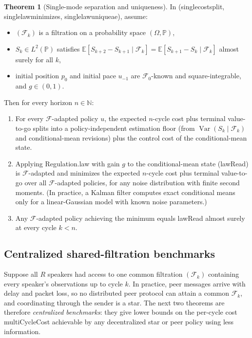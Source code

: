 \documentclass[11pt,a4paper]{article}
\DeclareRobustCommand{\lean}[1]{{\ttfamily\def\_{\textunderscore\allowbreak}#1}}
\newcommand{\E}{\mathbb{E}}
\newcommand{\Prob}{\mathbb{P}}
\theoremstyle{definition}
\newtheorem{theorem}[definition]{Theorem}
\begin{document}
\begin{theorem}[Single-mode separation and uniqueness]
\label{thm:single-sep}
In  (\lean{single\_cost\_split},
\lean{single\_law\_minimizes}, \lean{single\_law\_unique\_ae}), assume:
\begin{itemize}
\item $(\mathcal{F}_k)$ is a filtration on a probability space $(\Omega, \Prob)$,
\item $S_k \in L^2(\Prob)$ satisfies
  $\E[S_{k+2} - S_{k+1} \mid \mathcal{F}_k] =
   \E[S_{k+1} - S_k \mid \mathcal{F}_k]$ almost surely for all $k$,
\item initial position $p_0$ and initial pace $u_{-1}$ are
  $\mathcal{F}_0$-known and square-integrable, and $g \in (0, 1)$.
\end{itemize}
Then for every horizon $n \in \mathbb{N}$:
\begin{enumerate}
\item For every $\mathcal{F}$-adapted policy $u$, the expected $n$-cycle cost
  plus terminal value-to-go splits into a policy-independent estimation floor
  (from $\operatorname{Var}(S_k \mid \mathcal{F}_k)$ and conditional-mean
  revisions) plus the control cost of the conditional-mean state.
\item Applying \lean{Regulation.law} with gain $g$ to the conditional-mean
  state (\lean{lawRead}) is $\mathcal{F}$-adapted and minimizes the expected
  $n$-cycle cost plus terminal value-to-go over all $\mathcal{F}$-adapted
  policies, for any noise distribution with finite second moments. (In
  practice, a Kalman filter computes exact conditional means only for a
  linear-Gaussian model with known noise parameters.)
\item Any $\mathcal{F}$-adapted policy achieving the minimum equals
  \lean{lawRead} almost surely at every cycle $k < n$.
\end{enumerate}
\end{theorem}

\subsection{Centralized shared-filtration benchmarks}

Suppose all $R$ speakers had access to one common filtration $(\mathcal{F}_k)$
containing every speaker's observations up to cycle $k$. In practice, peer
messages arrive with delay and packet loss, so no distributed peer protocol can
attain a common $\mathcal{F}_k$, and coordinating through the sender is a star.
The next two theorems are therefore \emph{centralized benchmarks}: they give
lower bounds on the per-cycle cost \lean{multiCycleCost} achievable by any
decentralized star or peer policy using less information.
\end{document}
